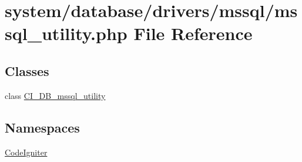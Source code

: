 \hypertarget{mssql__utility_8php}{}\section{system/database/drivers/mssql/mssql\+\_\+utility.php File Reference}
\label{mssql__utility_8php}
\subsection*{Classes}
\begin{DoxyCompactItemize}
\item 
class \mbox{\hyperlink{class_c_i___d_b__mssql__utility}{C\+I\+\_\+\+D\+B\+\_\+mssql\+\_\+utility}}
\end{DoxyCompactItemize}
\subsection*{Namespaces}
\begin{DoxyCompactItemize}
\item 
 \mbox{\hyperlink{namespace_code_igniter}{Code\+Igniter}}
\end{DoxyCompactItemize}
